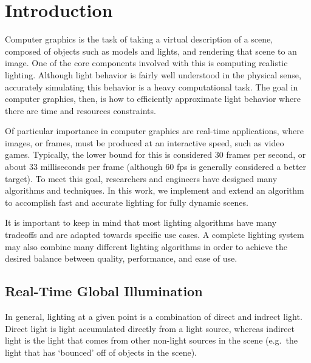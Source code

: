 \chapter{Introduction}
Computer graphics is the task of taking a virtual description of a scene, composed of objects such as models and lights, and rendering that scene to an image. One of the core components involved with this is computing realistic lighting. Although light behavior is fairly well understood in the physical sense, accurately simulating this behavior is a heavy computational task. The goal in computer graphics, then, is how to efficiently approximate light behavior where there are time and resources constraints.


Of particular importance in computer graphics are real-time applications, where images, or frames, must be produced at an interactive speed, such as video games. Typically, the lower bound for this is considered 30 frames per second, or about 33 milliseconds per frame (although 60 fps is generally considered a better target). To meet this goal, researchers and engineers have designed many algorithms and techniques.
In this work, we implement and extend an algorithm to accomplish fast and accurate lighting for fully dynamic scenes.

It is important to keep in mind that most lighting algorithms have many tradeoffs and are adapted towards specific use cases. A complete lighting system may also combine many different lighting algorithms in order to achieve the desired balance between quality, performance, and ease of use.


\section{Real-Time Global Illumination}
In general, lighting at a given point is a combination of direct and indrect light. Direct light is light accumulated directly from a light source, whereas indirect light is the light that comes from other non-light sources in the scene (e.g.\ the light that has `bounced' off of objects in the scene).

